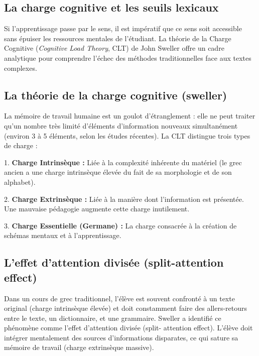 \subsection{La charge cognitive et les seuils lexicaux}

Si l'apprentissage passe par le sens, il est impératif que ce sens soit accessible sans épuiser les
ressources mentales de l'étudiant. La théorie de la Charge Cognitive (\textit{Cognitive Load
Theory}, CLT) de John Sweller offre un cadre analytique pour comprendre l'échec des méthodes
traditionnelles face aux textes complexes.



\subsection{La théorie de la charge cognitive (sweller)}

La mémoire de travail humaine est un goulot d'étranglement : elle ne peut traiter qu'un nombre très
limité d'éléments d'information nouveaux simultanément (environ 3 à 5 éléments, selon les études
récentes).\cite{II-3-3-ref37} La CLT distingue trois types de charge :

1. \textbf{Charge Intrinsèque :} Liée à la complexité inhérente du matériel (le grec ancien a une
charge intrinsèque élevée du fait de sa morphologie et de son alphabet).

2. \textbf{Charge Extrinsèque :} Liée à la manière dont l'information est présentée. Une mauvaise
pédagogie augmente cette charge inutilement.\cite{II-3-3-ref39}

3. \textbf{Charge Essentielle (Germane) :} La charge consacrée à la création de schémas mentaux et à
l'apprentissage.



\subsection{L'effet d'attention divisée (split-attention effect)}

Dans un cours de grec traditionnel, l'élève est souvent confronté à un texte original (charge
intrinsèque élevée) et doit constamment faire des allers-retours entre le texte, un dictionnaire, et
une grammaire. Sweller a identifié ce phénomène comme l'\og effet d'attention divisée\fg{} (split-
attention effect).\cite{II-3-3-ref41} L'élève doit intégrer mentalement des sources d'informations
disparates, ce qui sature sa mémoire de travail (charge extrinsèque massive).


